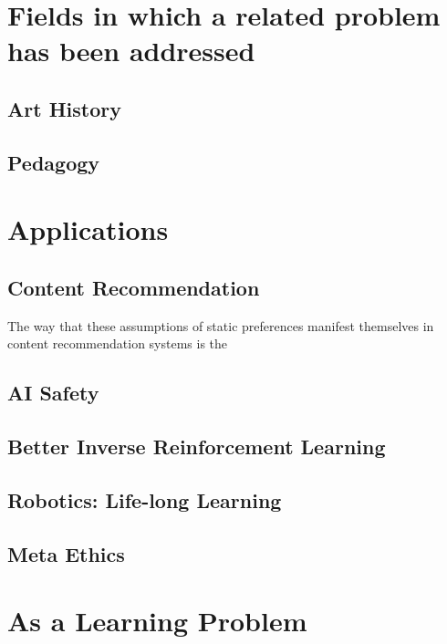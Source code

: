 \documentclass{book}
\begin{document}
	
	\section{Fields in which a related problem has been addressed}
	
	\subsection{Art History} %
	\subsection{Pedagogy} %
	\subsection{}
	
	
	\section{Applications}
	
	\subsection{Content Recommendation}
	The way that these assumptions of static preferences manifest themselves in content recommendation systems is the
	
	\subsection{AI Safety}
	\subsection{Better Inverse Reinforcement Learning}
	\subsection{Robotics: Life-long Learning}
	\subsection{Meta Ethics}
	
	\section{As a Learning Problem}
	
	
\end{document}
